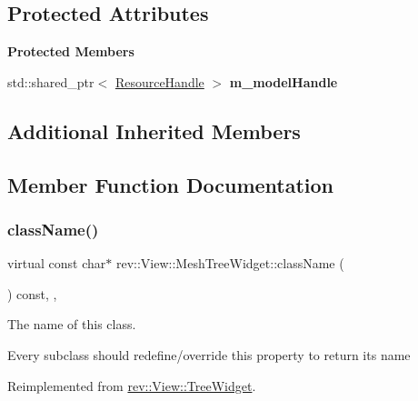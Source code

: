 \subsection*{Protected Attributes}
\begin{Indent}\textbf{ Protected Members}\par
\begin{DoxyCompactItemize}
\item 
\mbox{\label{classrev_1_1_view_1_1_mesh_tree_widget_aa0d3ba98ec844263d09cd5001e34a3ec}} 
std\+::shared\+\_\+ptr$<$ \mbox{\hyperlink{classrev_1_1_resource_handle}{Resource\+Handle}} $>$ {\bfseries m\+\_\+model\+Handle}
\end{DoxyCompactItemize}
\end{Indent}
\subsection*{Additional Inherited Members}


\subsection{Member Function Documentation}
\mbox{\label{classrev_1_1_view_1_1_mesh_tree_widget_a1fe0980bbddcafe4801991a0a70a8a3d}} 
\subsubsection{\texorpdfstring{className()}{className()}}
{\footnotesize\ttfamily virtual const char$\ast$ rev\+::\+View\+::\+Mesh\+Tree\+Widget\+::class\+Name (\begin{DoxyParamCaption}{ }\end{DoxyParamCaption}) const\hspace{0.3cm}{\ttfamily [inline]}, {\ttfamily [override]}, {\ttfamily [virtual]}}



The name of this class. 

Every subclass should redefine/override this property to return its name 

Reimplemented from \mbox{\hyperlink{classrev_1_1_view_1_1_tree_widget_aedde04f44badced7c60f0e1570e3d0b2}{rev\+::\+View\+::\+Tree\+Widget}}.

